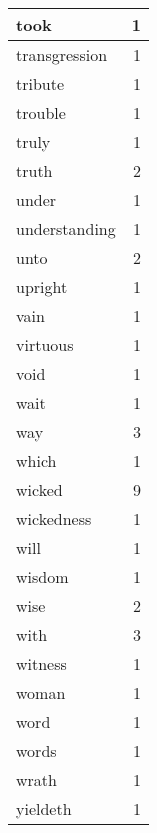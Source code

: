 \begin{center}
\begin{longtable}{l|r}
took & 1\\ \hline 
transgression & 1\\ \hline 
tribute & 1\\ \hline 
trouble & 1\\ \hline 
truly & 1\\ \hline 
truth & 2\\ \hline 
under & 1\\ \hline 
understanding & 1\\ \hline 
unto & 2\\ \hline 
upright & 1\\ \hline 
vain & 1\\ \hline 
virtuous & 1\\ \hline 
void & 1\\ \hline 
wait & 1\\ \hline 
way & 3\\ \hline 
which & 1\\ \hline 
wicked & 9\\ \hline 
wickedness & 1\\ \hline 
will & 1\\ \hline 
wisdom & 1\\ \hline 
wise & 2\\ \hline 
with & 3\\ \hline 
witness & 1\\ \hline 
woman & 1\\ \hline 
word & 1\\ \hline 
words & 1\\ \hline 
wrath & 1\\ \hline 
yieldeth & 1\\ \hline 
\end{longtable}  
\end{center}  


  
\normalsize  

  
  
